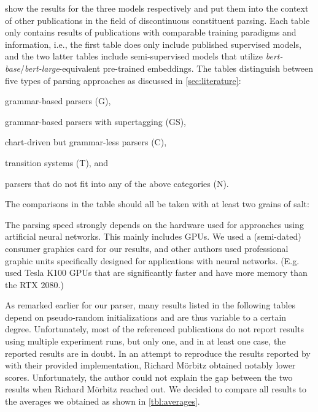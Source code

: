 \documentclass[../../document.tex]{subfiles}
\begin{document}
     show the results for the three models respectively and put them into the context of other publications in the field of discontinuous constituent parsing.
    Each table only contains results of publications with comparable training paradigms and information, i.e.\@, the first table does only include published supervised models, and the two latter tables include semi-supervised models that utilize \emph{bert-base}/\emph{bert-large}-equivalent pre-trained embeddings.
    The tables distinguish between five types of parsing approaches as discussed in \cref{sec:literature}:
    \begin{compactitem}
        \item grammar-based parsers (G),
        \item grammar-based parsers with supertagging (GS),
        \item chart-driven but grammar-less parsers (C),
        \item transition systems (T), and
        \item parsers that do not fit into any of the above categories (N).
    \end{compactitem}
    The comparisons in the table should all be taken with at least two grains of salt:
    \begin{inparaenum}
        \item The parsing speed strongly depends on the hardware used for approaches using artificial neural networks. This mainly includes GPUs. We used a (semi-dated) consumer graphics card for our results, and other authors used professional graphic units specifically designed for applications with neural networks. (E.g.\@ \citet{Cor20} used Tesla K100 GPUs that are significantly faster and have more memory than the RTX 2080.)
        \item As remarked earlier for our parser, many results listed in the following tables depend on pseudo-random initializations and are thus variable to a certain degree. Unfortunately, most of the referenced publications do not report results using multiple experiment runs, but only one, and in at least one case, the reported results are in doubt. In an attempt to reproduce the results reported by \citet{Cor20} with their provided implementation, Richard Mörbitz obtained notably lower scores. Unfortunately, the author could not explain the gap between the two results when Richard Mörbitz reached out. We decided to compare all results to the averages we obtained as shown in \cref{tbl:averages}.
    \end{inparaenum}
\end{document}

